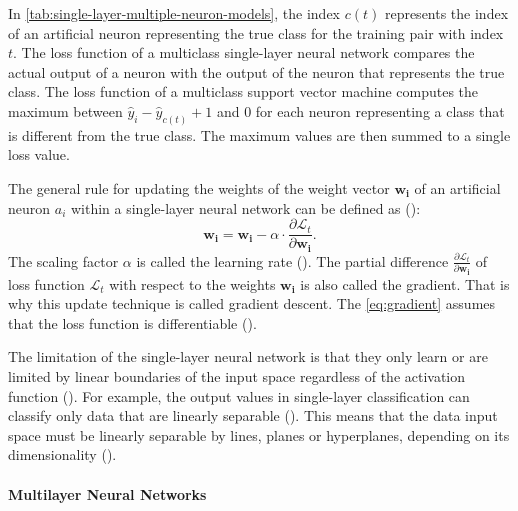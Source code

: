 \documentclass{BachelorBUI}
\begin{document}
                In \autoref{tab:single-layer-multiple-neuron-models}, the index $c(t)$ represents the index of an artificial neuron representing the true class for the training pair with index $t$. The loss function of a multiclass single-layer neural network compares the actual output of a neuron with the output of the neuron that represents the true class. The loss function of a multiclass support vector machine computes the maximum between $\hat{y}_i - \hat{y}_{c(t)} + 1$ and $0$ for each neuron representing a class that is different from the true class. The maximum values are then summed to a single loss value.

                The general rule for updating the weights of the weight vector $\mathbf{w_i}$ of an artificial neuron $a_{i}$ within a single-layer neural network can be defined as (\cite{Aggarwal:2018}):
                \begin{equation}
                    \mathbf{w_i} = \mathbf{w_i} - \alpha \cdot \frac{\partial \mathcal{L}_t}{\partial \mathbf{w_i}}.
                    \label{eq:gradient}
                \end{equation}
                The scaling factor $\alpha$ is called the learning rate (\cite{Aggarwal:2018}). The partial difference $\frac{\partial \mathcal{L}_t}{\partial \mathbf{w_i}}$ of loss function $\mathcal{L}_t$ with respect to the weights $\mathbf{w_i}$ is also called the gradient. That is why this update technique is called gradient descent. The \autoref{eq:gradient} assumes that the loss function is differentiable (\cite{Aggarwal:2018}).

                The limitation of the single-layer neural network is that they only learn or are limited by linear boundaries of the input space regardless of the activation function (\cite{Bishop:2024}). For example, the output values in single-layer classification can classify only data that are linearly separable (\cite{Bishop:2024}). This means that the data input space must be linearly separable by lines, planes or hyperplanes, depending on its dimensionality (\cite{Bishop:2024}).

            \paragraph{Multilayer Neural Networks}
\end{document}
